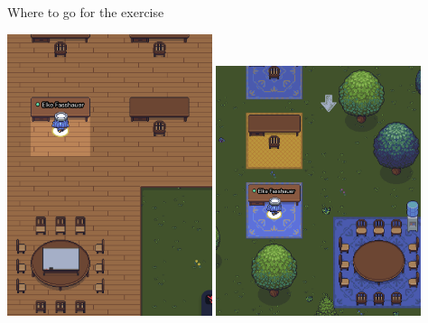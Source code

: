 \begin{frame}{Where to go for the exercise}

\begin{center}
\includegraphics[width=0.45\textwidth]{pics/navigation/sit_small_desk_2.png}
\hfill
\includegraphics[width=0.45\textwidth]{pics/navigation/sit_small_desk_1.png}
\end{center}

\end{frame}
